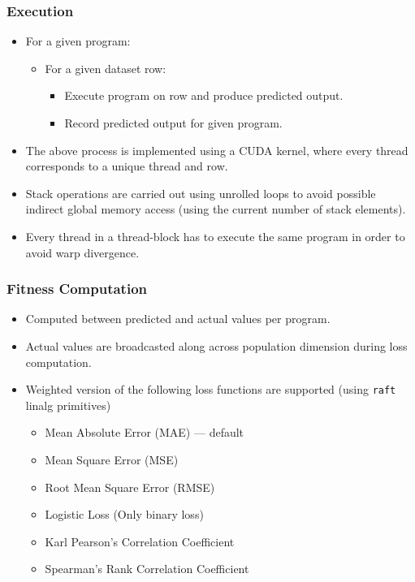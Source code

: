 \documentclass{beamer}
\begin{document}
\begin{frame}
  \frametitle{Execution}
  \begin{itemize}
    \item For a given program:
      \begin{itemize}
        \item For a given dataset row:
          \begin{itemize}
            \item Execute program on row and produce predicted output.
            \item Record predicted output for given program.
          \end{itemize}
      \end{itemize}
    \item The above process is implemented using a CUDA kernel, where every thread corresponds to a unique thread and row. 
    \item Stack operations are carried out using unrolled loops to avoid possible indirect global memory access (using the current number of stack elements).
    \item Every thread in a  thread-block has to execute the same program in order to avoid warp divergence.
  \end{itemize}
\end{frame}

\begin{frame}
  \frametitle{Fitness Computation}
  \begin{itemize}
    \item Computed between predicted and actual values per program. 
    \item Actual values are broadcasted along across population dimension during loss computation.
    \item Weighted version of the following loss functions are supported (using \texttt{raft} linalg primitives)
      \begin{itemize}
        \item Mean Absolute Error (MAE) --- default
        \item Mean Square Error (MSE)
        \item Root Mean Square Error (RMSE)
        \item Logistic Loss (Only binary loss)
        \item Karl Pearson's Correlation Coefficient 
        \item Spearman's Rank Correlation Coefficient
      \end{itemize}
  \end{itemize}
    
\end{frame}
\end{document}
